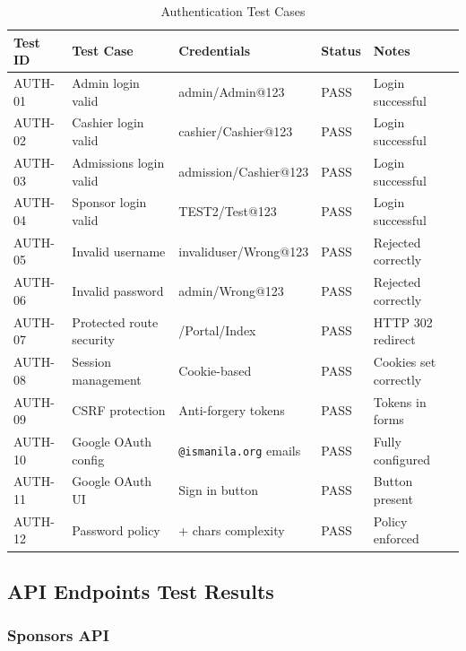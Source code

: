 \begin{table}[h!]
\centering
\caption{Authentication Test Cases}
\label{tab:appendix_auth_tests}
\renewcommand{\arraystretch}{1.15}
\setlength{\tabcolsep}{4pt}
\begin{tabularx}{\textwidth}{@{}
  >{\RaggedLeft\arraybackslash}p{1.2cm}
  >{\RaggedRight\arraybackslash}p{4.5cm}
  >{\RaggedRight\arraybackslash}p{2.8cm}
  >{\RaggedLeft\arraybackslash}p{1.8cm}
  >{\RaggedRight\arraybackslash}X
@{}}
\toprule
\textbf{Test ID} & \textbf{Test Case} & \textbf{Credentials} & \textbf{Status} & \textbf{Notes} \\
\midrule
AUTH-01 & Admin login valid & admin/Admin@123 & PASS & Login successful \\
AUTH-02 & Cashier login valid & cashier/Cashier@123 & PASS & Login successful \\
AUTH-03 & Admissions login valid & admission/Cashier@123 & PASS & Login successful \\
AUTH-04 & Sponsor login valid & TEST2/Test@123 & PASS & Login successful \\
AUTH-05 & Invalid username & invaliduser/Wrong@123 & PASS & Rejected correctly \\
AUTH-06 & Invalid password & admin/Wrong@123 & PASS & Rejected correctly \\
AUTH-07 & Protected route security & /Portal/Index & PASS & HTTP 302 redirect \\
AUTH-08 & Session management & Cookie-based & PASS & Cookies set correctly \\
AUTH-09 & CSRF protection & Anti-forgery tokens & PASS & Tokens in forms \\
AUTH-10 & Google OAuth config & \texttt{@ismanila.org} emails & PASS & Fully configured \\
AUTH-11 & Google OAuth UI & Sign in button & PASS & Button present \\
AUTH-12 & Password policy & 8+ chars complexity & PASS & Policy enforced \\
\bottomrule
\end{tabularx}
\end{table}

\subsection{API Endpoints Test Results}

\subsubsection{Sponsors API}

